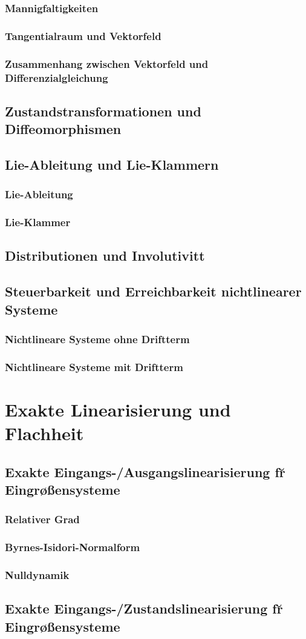 \subsubsection{Mannigfaltigkeiten}
\subsubsection{Tangentialraum und Vektorfeld}
\subsubsection{Zusammenhang zwischen Vektorfeld und Differenzialgleichung}
\subsection{Zustandstransformationen und Diffeomorphismen}
\subsection{Lie-Ableitung und Lie-Klammern}
\subsubsection{Lie-Ableitung}
\subsubsection{Lie-Klammer}
\subsection{Distributionen und Involutivit\a t}
\subsection{Steuerbarkeit und Erreichbarkeit nichtlinearer Systeme}
\subsubsection{Nichtlineare Systeme ohne Driftterm}
\subsubsection{Nichtlineare Systeme mit Driftterm}

\section{Exakte Linearisierung und Flachheit}
\subsection{Exakte Eingangs-/Ausgangslinearisierung f\u r Eingr\o \ss ensysteme}
\subsubsection{Relativer Grad}
\subsubsection{Byrnes-Isidori-Normalform}
\subsubsection{Nulldynamik}
\subsection{Exakte Eingangs-/Zustandslinearisierung f\u r Eingr\o \ss ensysteme}